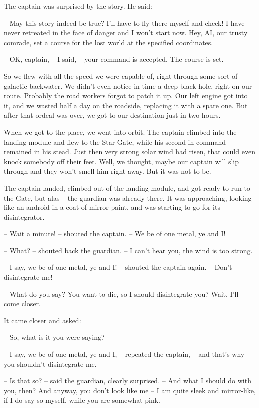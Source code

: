 \documentclass[ebook,oneside,final,openright]{memoir}
\begin{document}
The captain was surprised by the story. He said:\par
– May this story indeed be true? I’ll have to fly there myself and check! I have never retreated in the face of danger and I won’t start now. Hey, AI, our trusty comrade, set a course for the lost world at the specified coordinates.\par
– OK, captain, – I said, – your command is accepted. The course is set.\par
So we flew with all the speed we were capable of, right through some sort of galactic backwater. We didn’t even notice in time a deep black hole, right on our route. Probably the road workers forgot to patch it up. Our left engine got into it, and we wasted half a day on the roadside, replacing it with a spare one. But after that ordeal was over, we got to our destination just in two hours.\par
\par
When we got to the place, we went into orbit. The captain climbed into the landing module and flew to the Star Gate, while his second-in-command remained in his stead. Just then very strong solar wind had risen, that could even knock somebody off their feet. Well, we thought, maybe our captain will slip through and they won’t smell him right away. But it was not to be.\par
\par
The captain landed, climbed out of the landing module, and got ready to run to the Gate, but alas – the guardian was already there. It was approaching, looking like an android in a coat of mirror paint, and was starting to go for its disintegrator.\par
– Wait a minute! – shouted the captain. – We be of one metal, ye and I!\par
– What? – shouted back the guardian. – I can’t hear you, the wind is too strong.\par
– I say, we be of one metal, ye and I! – shouted the captain again. – Don’t disintegrate me!\par
– What do you say? You want to die, so I should disintegrate you? Wait, I’ll come closer.\par
\par
It came closer and asked:\par
– So, what is it you were saying?\par
– I say, we be of one metal, ye and I, – repeated the captain, – and that’s why you shouldn’t disintegrate me.\par
– Is that so? – said the guardian, clearly surprised. – And what I should do with you, then? And anyway, you don’t look like me – I am quite sleek and mirror-like, if I do say so myself, while you are somewhat pink.\par
\end{document}
